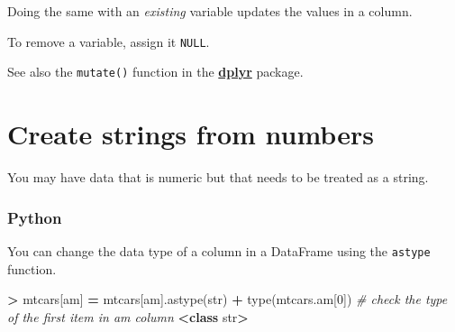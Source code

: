 \documentclass[
]{book}
\newenvironment{Shaded}{\begin{snugshade}}{\end{snugshade}}
\newcommand{\BuiltInTok}[1]{#1}
\newcommand{\CommentTok}[1]{\textcolor[rgb]{0.56,0.35,0.01}{\textit{#1}}}
\newcommand{\ConstantTok}[1]{\textcolor[rgb]{0.00,0.00,0.00}{#1}}
\newcommand{\DecValTok}[1]{\textcolor[rgb]{0.00,0.00,0.81}{#1}}
\newcommand{\ErrorTok}[1]{\textcolor[rgb]{0.64,0.00,0.00}{\textbf{#1}}}
\newcommand{\KeywordTok}[1]{\textcolor[rgb]{0.13,0.29,0.53}{\textbf{#1}}}
\newcommand{\NormalTok}[1]{#1}
\newcommand{\OperatorTok}[1]{\textcolor[rgb]{0.81,0.36,0.00}{\textbf{#1}}}
\newcommand{\OtherTok}[1]{\textcolor[rgb]{0.56,0.35,0.01}{#1}}
\newcommand{\SpecialCharTok}[1]{\textcolor[rgb]{0.00,0.00,0.00}{#1}}
\newcommand{\StringTok}[1]{\textcolor[rgb]{0.31,0.60,0.02}{#1}}
\begin{document}
Doing the same with an \emph{existing} variable updates the values in a column.

\begin{Shaded}
\end{Shaded}

To remove a variable, assign it \texttt{NULL}.

\begin{Shaded}
\end{Shaded}

See also the \texttt{mutate()} function in the \href{https://dplyr.tidyverse.org/}{\textbf{dplyr}} package.

\hypertarget{create-strings-from-numbers}{%
\section{Create strings from numbers}\label{create-strings-from-numbers}}

You may have data that is numeric but that needs to be treated as a string.

\hypertarget{python-22}{%
\subsubsection*{Python}\label{python-22}}

You can change the data type of a column in a DataFrame using the \texttt{astype} function.

\begin{Shaded}
\begin{Highlighting}[]
\OperatorTok{\textgreater{}}\NormalTok{ mtcars[}\StringTok{\textquotesingle{}am\textquotesingle{}}\NormalTok{] }\OperatorTok{=}\NormalTok{ mtcars[}\StringTok{\textquotesingle{}am\textquotesingle{}}\NormalTok{].astype(}\BuiltInTok{str}\NormalTok{)}
\OperatorTok{+} \BuiltInTok{type}\NormalTok{(mtcars.am[}\DecValTok{0}\NormalTok{]) }\CommentTok{\# check the type of the first item in \textquotesingle{}am\textquotesingle{} column}
\OperatorTok{\textless{}}\KeywordTok{class} \StringTok{\textquotesingle{}str\textquotesingle{}}\OperatorTok{\textgreater{}}
\end{Highlighting}
\end{Shaded}
\end{document}
